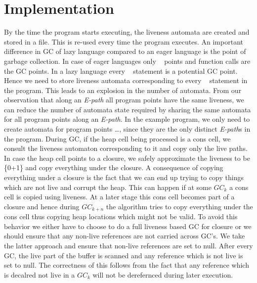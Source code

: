 \documentclass{sig-alternate}
\begin{document}
\section{Implementation}
By the time the program starts executing, the liveness automata are created and stored in a file. 
This is re-used every time the program executes. 
An important difference in GC of lazy language compared to an eager language is the point of 
garbage collection. In case of eager languages only \CONS~ points and function calls are 
the GC points. In a lazy language every \LET~ statement is a potential GC point. Hence we need to store 
liveness automata corresponding to every \LET~ statement in the program. This leads to an explosion 
in the number of automata. From our observation that along an {\em E-path} all program points have 
the same liveness, we can reduce the number of automata state required by sharing the same automata 
for all program points along an {\em E-path}. In the example program, we only need to create automata 
for program points \ldots, since they are the only distinct {\em E-path}s in the program. 
During GC, if the heap cell being processed is a cons cell, we consult the liveness automaton 
corresponding to it and copy only the live paths. In case the heap cell points to a closure, 
we safely approximate the liveness to be {\{0+1\}\*} and copy everything under the closure.
A consequence of copying everything under a closure is the fact that we can end up trying to copy 
things which are not live and corrupt the heap. This can happen if at some $GC_k$ a cons cell is copied 
using liveness. At a later stage this cons cell becomes part of a closure and hence during $GC_{k+n}$ the 
algorithm tries to copy everything under the cons cell thus copying heap locations which might not be valid. 
To avoid this behavior we either have to choose to do a full liveness based GC for closure or we should 
ensure that any non-live references are not carried across GC's. We take the latter approach and ensure that 
non-live references are set to null. After every GC, the live part of the buffer is scanned and any reference 
which is not live is set to null. The correctness of this follows from the fact that any reference which is 
decalred not live in a $GC_k$ will not be derefernced during later execution.
\end{document}
